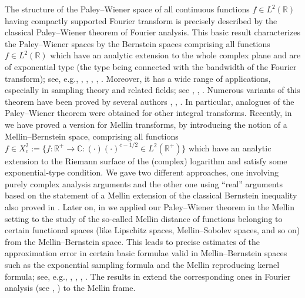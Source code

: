 \documentclass[amsmath,english,a4paper,graphicx,12pt]{article}
\begin{document}
The structure of the Paley--Wiener space of all continuous functions $f \in L^2(\mathbb{R})$ having compactly supported Fourier transform 
is precisely described by the classical Paley--Wiener theorem of Fourier analysis. This basic result characterizes the Paley--Wiener spaces 
by the Bernstein spaces comprising all functions $f \in L^2(\mathbb{R})$ which have an analytic extension to the whole complex plane and 
are of exponential type (the type being connected with the bandwidth of the Fourier transform); see, e.g., \cite{BO}, \cite{YO}, \cite{RU}, 
\cite{RU1}, \cite{HIG}. Moreover, it  has a wide range of applications, especially in sampling theory and related fields; see 
\cite{HIG}, \cite{RS}, \cite{SCH}. Numerous variants of this theorem have been proved by several authors \cite{AN}, \cite{AD}, \cite{TU}. 
In particular, analogues of the Paley--Wiener theorem were obtained for other integral transforms. Recently, in \cite{BBMS} we have proved 
a version for Mellin transforms, by introducing the notion of a Mellin--Bernstein space, comprising all  functions 
$f \in X^2_c:=\{f:\mathbb{R}^+ \rightarrow \mathbb{C}: (\cdot) (\cdot)^{c -1/2} \in L^2(\mathbb{R}^+)\}$  which have an analytic extension to 
the Riemann surface of the (complex) logarithm and satisfy some exponential-type condition. We gave two different approaches, one involving 
purely complex analysis arguments and the other one using ``real'' arguments based on the statement of a Mellin extension of the classical 
Bernstein inequality also proved in \cite{BBMS}. Later on, in \cite{BBMS2} we applied our Paley--Wiener theorem in the Mellin setting to the 
study of the so-called Mellin distance of functions belonging to certain functional spaces (like Lipschitz spaces, Mellin--Sobolev spaces, and so on) 
from the Mellin--Bernstein space. This leads to precise estimates of the approximation error in certain basic formulae valid in Mellin--Bernstein 
spaces such as the exponential sampling formula and the Mellin reproducing kernel formula; see, e.g., \cite{BP}, \cite{BJ3}, \cite{BBM1}, \cite{BBM3}. 
The results in \cite{BBMS2} extend the corresponding ones in Fourier analysis (see \cite{BSS}, \cite{BSS2}) to the Mellin frame.
\end{document}
